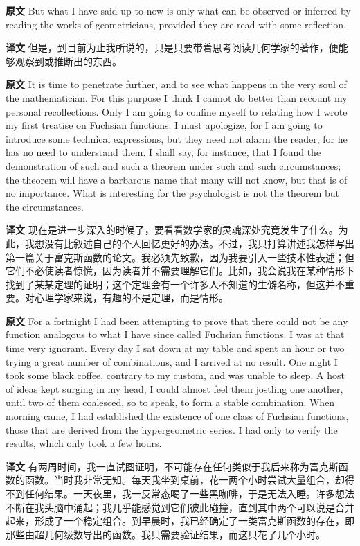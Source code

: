 \documentclass[UTF8,zihao=-4]{ctexart}
\newcommand{\BodyFont}{\fontsize{10.5pt}{15.5pt}\selectfont}
\newcommand{\origlabel}{\textbf{原文}\quad}
\newcommand{\translabel}{\textbf{译文}\quad}
\newenvironment{enblock}{\par\noindent\begingroup\BodyFont\origlabel}{\par\endgroup}
\newenvironment{zhblock}{\par\noindent\begingroup\BodyFont\translabel}{\par\endgroup\vspace{0.35em}}
\begin{document}
\begin{enblock}
But what I have said up to now is only what can be observed or inferred by reading the works of geometricians, provided they are read with some reflection.
\end{enblock}
\begin{zhblock}
但是，到目前为止我所说的，只是只要带着思考阅读几何学家的著作，便能够观察到或推断出的东西。\end{zhblock}

\begin{enblock}
It is time to penetrate further, and to see what happens in the very soul of the mathematician. For this purpose I think I cannot do better than recount my personal recollections. Only I am going to confine myself to relating how I wrote my first treatise on Fuchsian functions. I must apologize, for I am going to introduce some technical expressions, but they need not alarm the reader, for he has no need to understand them. I shall say, for instance, that I found the demonstration of such and such a theorem under such and such circumstances; the theorem will have a barbarous name that many will not know, but that is of no importance. What is interesting for the psychologist is not the theorem but the circumstances.
\end{enblock}
\begin{zhblock}
现在是进一步深入的时候了，要看看数学家的灵魂深处究竟发生了什么。为此，我想没有比叙述自己的个人回忆更好的办法。不过，我只打算讲述我怎样写出第一篇关于富克斯函数的论文。我必须先致歉，因为我要引入一些技术性表述；但它们不必使读者惊慌，因为读者并不需要理解它们。比如，我会说我在某种情形下找到了某某定理的证明；这个定理会有一个许多人不知道的生僻名称，但这并不重要。对心理学家来说，有趣的不是定理，而是情形。\end{zhblock}

\begin{enblock}
For a fortnight I had been attempting to prove that there could not be any function analogous to what I have since called Fuchsian functions. I was at that time very ignorant. Every day I sat down at my table and spent an hour or two trying a great number of combinations, and I arrived at no result. One night I took some black coffee, contrary to my custom, and was unable to sleep. A host of ideas kept surging in my head; I could almost feel them jostling one another, until two of them coalesced, so to speak, to form a stable combination. When morning came, I had established the existence of one class of Fuchsian functions, those that are derived from the hypergeometric series. I had only to verify the results, which only took a few hours.
\end{enblock}
\begin{zhblock}
有两周时间，我一直试图证明，不可能存在任何类似于我后来称为富克斯函数的函数。当时我非常无知。每天我坐到桌前，花一两个小时尝试大量组合，却得不到任何结果。一天夜里，我一反常态喝了一些黑咖啡，于是无法入睡。许多想法不断在我头脑中涌起；我几乎能感觉到它们彼此碰撞，直到其中两个可以说是合并起来，形成了一个稳定组合。到早晨时，我已经确定了一类富克斯函数的存在，即那些由超几何级数导出的函数。我只需要验证结果，而这只花了几个小时。\end{zhblock}
\end{document}
